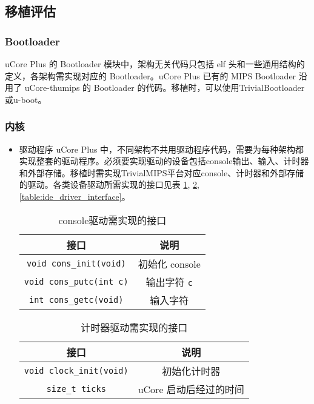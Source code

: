 \subsection{移植评估}
\subsubsection{Bootloader}
uCore Plus 的 Bootloader 模块中，架构无关代码只包括 elf 头和一些通用结构的定义，各架构需实现对应的 Bootloader。uCore Plus 已有的 MIPS Bootloader 沿用了 uCore-thumips 的 Bootloader 的代码。移植时，可以使用TrivialBootloader或u-boot。
\subsubsection{内核}
\begin{itemize}
\item{驱动程序}
uCore Plus 中，不同架构不共用驱动程序代码，需要为每种架构都实现整套的驱动程序。必须要实现驱动的设备包括console输出、输入、计时器和外部存储。移植时需实现TrivialMIPS平台对应console、计时器和外部存储的驱动。各类设备驱动所需实现的接口见表 \ref{table:console_driver_interface}, \ref{table:timer_driver_interface}, \ref{table:ide_driver_interface}。

\begin{table}[!htbp]
\centering
\begin{tabular}{|c|c|}
\hline
\textbf{接口}                                      & \textbf{说明}                      \\ \hline
\texttt{void cons\_init(void)}  & 初始化 console                      \\ \hline
\texttt{void cons\_putc(int c)} & 输出字符 \texttt{c} \\ \hline
\texttt{int cons\_getc(void)}   & 输入字符                             \\ \hline
\end{tabular}
    \caption{console驱动需实现的接口}
    \label{table:console_driver_interface}
\end{table}


\begin{table}[!htbp]
\centering
\begin{tabular}{|c|c|}
\hline
\textbf{接口}                                      & \textbf{说明}                      \\ \hline
\texttt{void clock\_init(void)}  & 初始化计时器                      \\ \hline
\texttt{size\_t ticks}   & uCore 启动后经过的时间                             \\ \hline
\end{tabular}
    \caption{计时器驱动需实现的接口}
    \label{table:timer_driver_interface}
\end{table}


\end{itemize}
